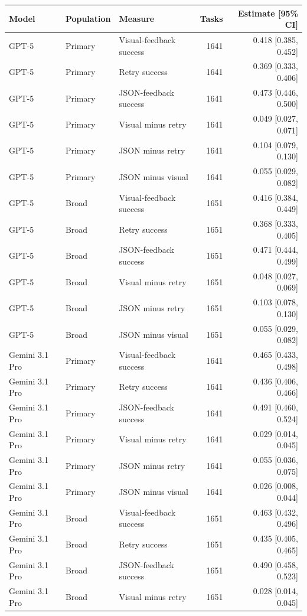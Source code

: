 \begin{tabular}{lllrr}
\toprule
Model & Population & Measure & Tasks & Estimate [95\% CI] \\
\midrule
GPT-5 & Primary & Visual-feedback success & 1641 & 0.418 [0.385, 0.452] \\
GPT-5 & Primary & Retry success & 1641 & 0.369 [0.333, 0.406] \\
GPT-5 & Primary & JSON-feedback success & 1641 & 0.473 [0.446, 0.500] \\
GPT-5 & Primary & Visual minus retry & 1641 & 0.049 [0.027, 0.071] \\
GPT-5 & Primary & JSON minus retry & 1641 & 0.104 [0.079, 0.130] \\
GPT-5 & Primary & JSON minus visual & 1641 & 0.055 [0.029, 0.082] \\
GPT-5 & Broad & Visual-feedback success & 1651 & 0.416 [0.384, 0.449] \\
GPT-5 & Broad & Retry success & 1651 & 0.368 [0.333, 0.405] \\
GPT-5 & Broad & JSON-feedback success & 1651 & 0.471 [0.444, 0.499] \\
GPT-5 & Broad & Visual minus retry & 1651 & 0.048 [0.027, 0.069] \\
GPT-5 & Broad & JSON minus retry & 1651 & 0.103 [0.078, 0.130] \\
GPT-5 & Broad & JSON minus visual & 1651 & 0.055 [0.029, 0.082] \\
Gemini 3.1 Pro & Primary & Visual-feedback success & 1641 & 0.465 [0.433, 0.498] \\
Gemini 3.1 Pro & Primary & Retry success & 1641 & 0.436 [0.406, 0.466] \\
Gemini 3.1 Pro & Primary & JSON-feedback success & 1641 & 0.491 [0.460, 0.524] \\
Gemini 3.1 Pro & Primary & Visual minus retry & 1641 & 0.029 [0.014, 0.045] \\
Gemini 3.1 Pro & Primary & JSON minus retry & 1641 & 0.055 [0.036, 0.075] \\
Gemini 3.1 Pro & Primary & JSON minus visual & 1641 & 0.026 [0.008, 0.044] \\
Gemini 3.1 Pro & Broad & Visual-feedback success & 1651 & 0.463 [0.432, 0.496] \\
Gemini 3.1 Pro & Broad & Retry success & 1651 & 0.435 [0.405, 0.465] \\
Gemini 3.1 Pro & Broad & JSON-feedback success & 1651 & 0.490 [0.458, 0.523] \\
Gemini 3.1 Pro & Broad & Visual minus retry & 1651 & 0.028 [0.014, 0.045] \\

\end{tabular}
